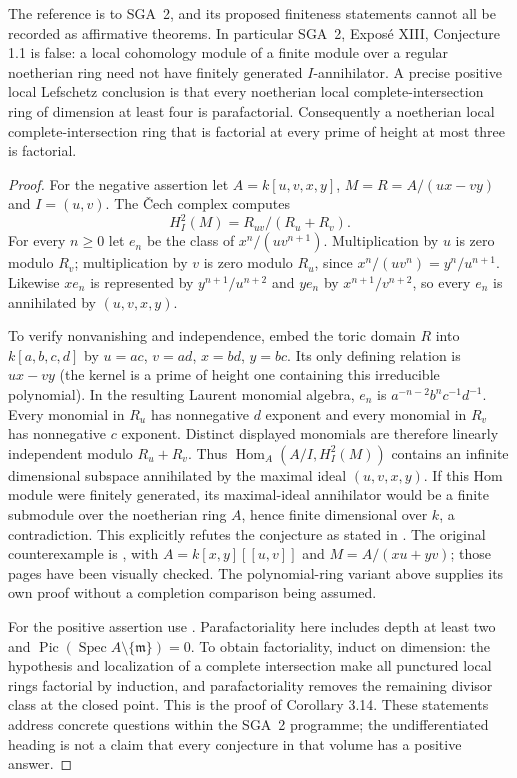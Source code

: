 \begin{theorem}\label{thm:B3-sga2}
The reference is to SGA~2, and its proposed finiteness statements
cannot all be recorded as affirmative theorems. In particular
SGA~2, Expos\'e XIII, Conjecture 1.1 is false: a local cohomology
module of a finite module over a regular noetherian ring need not
have finitely generated $I$-annihilator.
A precise positive local Lefschetz conclusion is that every
noetherian local complete-intersection ring of dimension at least
four is parafactorial. Consequently a noetherian local
complete-intersection ring that is factorial at every prime of
height at most three is factorial.
\end{theorem}
\begin{proof}
For the negative assertion let $A=k[u,v,x,y]$,
$M=R=A/(ux-vy)$ and $I=(u,v)$. The \v{C}ech complex computes
\[
              H^2_I(M)=R_{uv}/(R_u+R_v).
\]
For every $n\geq0$ let $e_n$ be the class of
$x^n/(uv^{n+1})$. Multiplication by $u$ is zero modulo $R_v$;
multiplication by $v$ is zero modulo $R_u$, since
$x^n/(uv^n)=y^n/u^{n+1}$. Likewise $xe_n$ is represented by
$y^{n+1}/u^{n+2}$ and $ye_n$ by $x^{n+1}/v^{n+2}$, so every
$e_n$ is annihilated by $(u,v,x,y)$.

To verify nonvanishing and independence, embed the toric domain
$R$ into $k[a,b,c,d]$ by
$u=ac$, $v=ad$, $x=bd$, $y=bc$.
Its only defining relation is $ux-vy$ (the kernel is a prime of
height one containing this irreducible polynomial).
In the resulting Laurent monomial algebra, $e_n$ is
$a^{-n-2}b^nc^{-1}d^{-1}$. Every monomial in $R_u$ has
nonnegative $d$ exponent and every monomial in $R_v$ has
nonnegative $c$ exponent. Distinct displayed monomials are
therefore linearly independent modulo $R_u+R_v$.
Thus $\operatorname{Hom}_A(A/I,H^2_I(M))$ contains an infinite
dimensional subspace annihilated by the maximal ideal
$(u,v,x,y)$. If this Hom module were finitely generated, its
maximal-ideal annihilator would be a finite submodule over the
noetherian ring $A$, hence finite dimensional over $k$, a
contradiction. This explicitly refutes the conjecture as stated
in \cite[Expos\'e XIII, Conjecture 1.1, pp.~173--174 of the original;
editorial discussion and Hartshorne attribution]{BSGA2}.
The original counterexample is
\cite[Section 3, pp.~149--151]{BHartshorne1970}, with
$A=k[x,y][[u,v]]$ and $M=A/(xu+yv)$; those pages have been
visually checked. The polynomial-ring variant above supplies
its own proof without a completion comparison being assumed.

For the positive assertion use
\cite[Expos\'e XI, Theorem 3.13(ii) and Corollary 3.14,
original p.~132]{BSGA2}. Parafactoriality here includes depth
at least two and $\operatorname{Pic}(\operatorname{Spec}A\setminus
\{\mathfrak m\})=0$. To obtain factoriality, induct on dimension:
the hypothesis and localization of a complete intersection make
all punctured local rings factorial by induction, and
parafactoriality removes the remaining divisor class at the
closed point. This is the proof of Corollary 3.14. These statements
address concrete questions within the SGA~2 programme; the
undifferentiated heading is not a claim that every conjecture in
that volume has a positive answer.
\end{proof}
